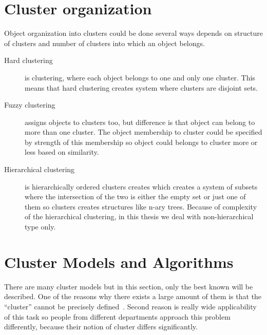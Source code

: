 \section{Cluster organization}
Object organization into clusters could be done several ways depends on structure of clusters and number of clusters into which an object belongs.
\begin{description}
\item[Hard clustering] is clustering, where each object belongs to one and only one cluster. This means that hard clustering creates system where clusters are disjoint sets.
\item[Fuzzy clustering] assigns objects to clusters too, but difference is that object can belong to more than one cluster. The object membership to cluster could be specified by strength of this membership so object could belongs to cluster more or less based on similarity.
\item[Hierarchical clustering] is hierarchically ordered clusters creates which creates a system of subsets where the intersection of the two is either the empty set or just one of them so clusters creates structures like n-ary trees. Because of complexity of the hierarchical clustering, in this thesis we deal with non-hierarchical type only.
\end{description}

\section{Cluster Models and Algorithms} \label{sec:clustermodels}
There are many cluster models but in this section, only the best known will be described. One of the reasons why there exists a large amount of them is that the ``cluster'' cannot be precisely defined~\cite{EstivillCastro02}. Second reason is really wide applicability of this task so people from different departments approach this problem differently, because their notion of cluster differs significantly. \\

